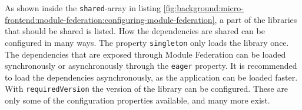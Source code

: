 \bigskip

\noindent As shown inside the \texttt{shared}-array in listing \ref{fig:background:micro-frontend:module-federation:configuring-module-federation}, a part of the libraries that should be shared is listed. How the dependencies are shared can be configured in many ways. The property \texttt{singleton} only loads the library once. The dependencies that are exposed through Module Federation can be loaded synchronously or asynchronously through the \texttt{eager} property. It is recommended to load the dependencies asynchronously, as the application can be loaded faster. With \texttt{requiredVersion} the version of the library can be configured. These are only some of the configuration properties available, and many more exist. \cite[125]{book:2021:mezzalira:applied-methods:building-micro-frontends}
